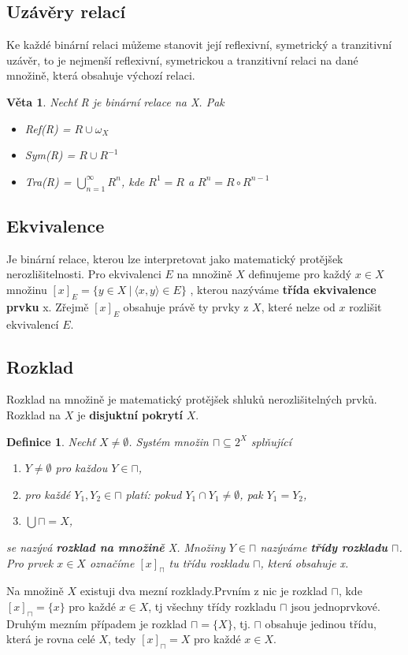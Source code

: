 \documentclass[12pt,a4paper]{article}
\newtheorem{definition}{Definice}
\newtheorem{sentence}{Věta}
\begin{document}
\subsection{Uzávěry relací}
Ke každé binární relaci můžeme stanovit její reflexivní, symetrický a tranzitivní uzávěr, to je nejmenší reflexivní, symetrickou a tranzitivní relaci na dané množině, která obsahuje výchozí relaci.

\begin{sentence}
	Nechť R je binární relace na X. Pak
	\begin{itemize}
		\item Ref(R) = $R \cup \omega_X$
		\item Sym(R) = $R \cup R^{-1}$
		\item Tra(R) = $\bigcup^\infty_{n=1} R^n$, kde $R^1 = R$ a $R^n = R \circ R^{n-1}$
	\end{itemize}
\end{sentence}

\subsection{Ekvivalence}
Je binární relace, kterou lze interpretovat jako matematický protějšek nerozlišitelnosti. Pro ekvivalenci $E$ na množině $X$ definujeme pro každý $x \in X$ množinu $[x]_E = \{ y \in X \ | \ \langle x, y \rangle \in E\} $
, kterou nazýváme \textbf{třída ekvivalence prvku} x. Zřejmě $[x]_E$ obsahuje právě ty prvky z $X$, které nelze od $x$ rozlišit ekvivalencí $E$.

\subsection{Rozklad}
Rozklad na množině je matematický protějšek shluků nerozlišitelných prvků. Rozklad na $X$ je \textbf{disjuktní pokrytí} $X$.

\begin{definition}
	Nechť $X \not= \emptyset$. Systém množin $\sqcap \subseteq 2^X$ splňující
	\begin{enumerate}
		\item $Y \not= \emptyset$ pro každou $Y \in \sqcap$,
		\item pro každé $Y_1,Y_2 \in \sqcap$ platí: pokud $Y_1 \cap Y_1 \not= \emptyset$, pak $Y_1 = Y_2$,
		\item $\bigcup\sqcap = X$,
	\end{enumerate}
	se nazývá \textbf{rozklad na množině} X. Množiny $Y \in \sqcap$ nazýváme \textbf{třídy rozkladu} $\sqcap$. Pro prvek $x \in X$ označíme $[x]_\sqcap$ tu třídu rozkladu $\sqcap$, která obsahuje x.
\end{definition}
Na množině $X$ existuji dva mezní rozklady.Prvním z nic je rozklad $\sqcap$, kde $[x]_\sqcap = \{x\}$ pro každé $x \in X$, tj všechny třídy rozkladu $\sqcap$ jsou jednoprvkové. Druhým mezním případem je rozklad $\sqcap = \{X\}$, tj. $\sqcap$ obsahuje jedinou třídu, která je rovna celé $X$, tedy $[x]_\sqcap = X$ pro každé $x \in X$.
\end{document}
